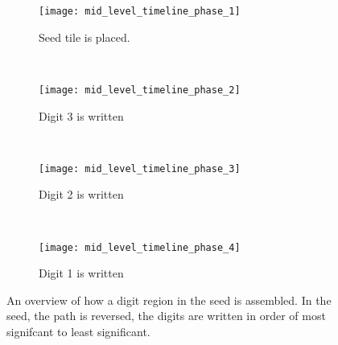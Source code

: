 \documentclass[10pt]{article}
\title{}
\author{Logan Withers}
\date{}
\begin{document}
\begin{figure}
    \centering

    \begin{subfigure}[t]{0.23\textwidth}
        \centering
        \texttt{[image: mid\_level\_timeline\_phase\_1]}
        \caption{\label{fig:mid_level_timeline_phase_1} Seed tile is placed. }
    \end{subfigure} %
    ~
    \begin{subfigure}[t]{0.23\textwidth}
        \centering
        \texttt{[image: mid\_level\_timeline\_phase\_2]}
        \caption{\label{fig:mid_level_timeline_phase_2} Digit 3 is written }
    \end{subfigure}%
   ~
    \begin{subfigure}[t]{0.23\textwidth}
        \centering
        \texttt{[image: mid\_level\_timeline\_phase\_3]}
        \caption{\label{fig:mid_level_timeline_phase_3} Digit 2 is written }
    \end{subfigure}%
    ~
    \begin{subfigure}[t]{0.23\textwidth}
        \centering
        \texttt{[image: mid\_level\_timeline\_phase\_4]}
        \caption{\label{fig:mid_level_timeline_phase_4} Digit 1 is written }
    \end{subfigure}

    \caption{\label{fig:mid_level_timeline_overview} An overview of how a digit region in the seed is assembled. In the seed, the path is reversed, the digits are written in order of most signifcant to least significant. }
\end{figure}
\end{document}
